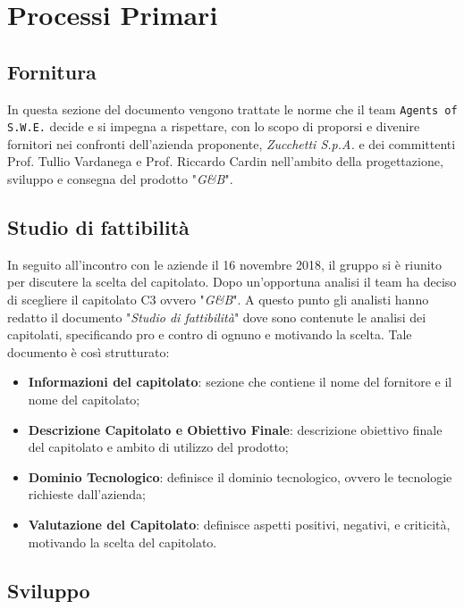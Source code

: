 \section{Processi Primari}\label{ProcessiPrimari}

\subsection{Fornitura}
In questa sezione del documento vengono trattate le norme che il team \texttt{Agents of S.W.E.} decide e si impegna a rispettare, con lo scopo di proporsi e divenire fornitori nei confronti dell'azienda proponente, \textit{Zucchetti S.p.A.} e dei committenti Prof. Tullio Vardanega e Prof. Riccardo Cardin nell'ambito della progettazione, sviluppo e consegna del prodotto "\textit{G\&B}".

\subsection{Studio di fattibilità} \label{ProcessiPrimari_Sviluppo_StudioFattibilità}
In seguito all'incontro con le aziende il 16 novembre 2018, il gruppo si è riunito per discutere la scelta del capitolato. Dopo un'opportuna analisi il team ha deciso di scegliere il capitolato C3 ovvero "\textit{G\&B}". A questo punto gli analisti hanno redatto il documento "\textit{Studio di fattibilità}" dove sono contenute le analisi dei capitolati, specificando pro e contro di ognuno e motivando la scelta.
Tale documento è così strutturato: 
\begin{itemize}
	\item \textbf{Informazioni del capitolato}: sezione che contiene il nome del fornitore e il nome del capitolato;
	\item \textbf{Descrizione Capitolato e Obiettivo Finale}: descrizione obiettivo finale del capitolato e ambito di utilizzo del prodotto;
	\item \textbf{Dominio Tecnologico}: definisce il dominio tecnologico, ovvero le tecnologie richieste dall'azienda;
	\item \textbf{Valutazione del Capitolato}: definisce aspetti positivi, negativi, e criticità, motivando la scelta del capitolato.  
\end{itemize} 
\subsection{Sviluppo}
